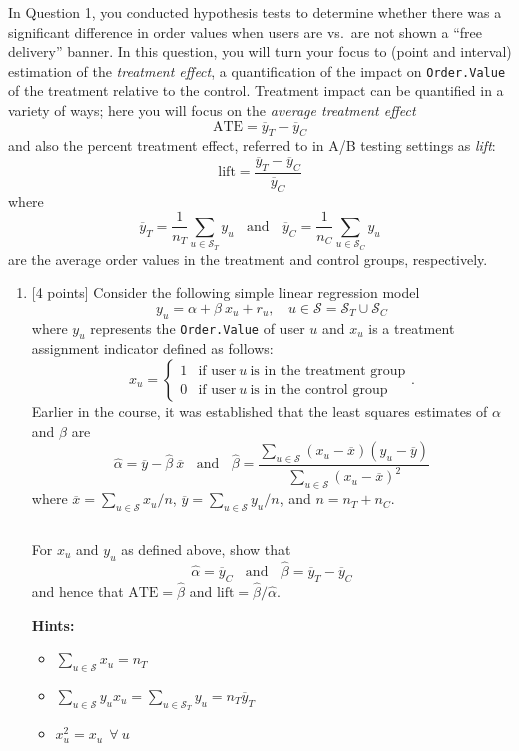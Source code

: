 \documentclass[
]{article}
\providecommand{\tightlist}{%
  \setlength{\itemsep}{0pt}\setlength{\parskip}{0pt}}
\begin{document}
In Question 1, you conducted hypothesis tests to determine whether there
was a significant difference in order values when users are vs.~are not
shown a ``free delivery'' banner. In this question, you will turn your
focus to (point and interval) estimation of the \emph{treatment effect},
a quantification of the impact on \texttt{Order.Value} of the treatment
relative to the control. Treatment impact can be quantified in a variety
of ways; here you will focus on the \emph{average treatment effect}
\[\text{ATE} = \overline{y}_T-\overline{y}_C\] and also the percent
treatment effect, referred to in A/B testing settings as \emph{lift}:
\[\text{lift} = \frac{\overline{y}_T-\overline{y}_C}{\overline{y}_C}\]
where
\[\overline{y}_T = \frac{1}{n_T}\sum_{u\in\mathcal{S}_T}y_u ~~~~ \text{and} ~~~~ \overline{y}_C = \frac{1}{n_C}\sum_{u\in\mathcal{S}_C}y_u\]
are the average order values in the treatment and control groups,
respectively.

\begin{enumerate}
\def\labelenumi{(\alph{enumi})}
\item
  {[}4 points{]} Consider the following simple linear regression model
  \[y_u = \alpha + \beta~x_u+r_u, ~~~~ u\in\mathcal{S}=\mathcal{S}_T\cup\mathcal{S}_C\]
  where \(y_u\) represents the \texttt{Order.Value} of user \(u\) and
  \(x_u\) is a treatment assignment indicator defined as follows:
  \[x_u =
    \begin{cases}
  1 & \text{if user}~u~\text{is in the treatment group} \\
  0 & \text{if user}~u~\text{is in the control group}
    \end{cases}.\] Earlier in the course, it was established that the
  least squares estimates of \(\alpha\) and \(\beta\) are
  \[\hat\alpha=\overline{y}-\hat\beta~\overline{x} ~~~~ \text{and} ~~~~ \hat\beta=\frac{\sum_{u\in\mathcal{S}}(x_u-\overline{x})(y_u-\overline{y})}{\sum_{u\in\mathcal{S}}(x_u-\overline{x})^2}\]
  where \(\overline{x} = \sum_{u\in\mathcal{S}}x_u/n\),
  \(\overline{y} = \sum_{u\in\mathcal{S}}y_u/n\), and \(n= n_T + n_C\).

  \(\;\)

  For \(x_u\) and \(y_u\) as defined above, show that
  \[\hat\alpha = \overline{y}_C~~~~ \text{and} ~~~~\hat\beta=\overline{y}_T-\overline{y}_C\]
  and hence that \(\text{ATE}=\hat\beta\) and
  \(\text{lift}=\hat\beta/\hat\alpha\).

  \textbf{Hints:}

  \begin{itemize}
  \tightlist
  \item
    \(\sum_{u\in\mathcal{S}}x_u = n_T\)
  \item
    \(\sum_{u\in\mathcal{S}}y_ux_u = \sum_{u\in\mathcal{S}_T}y_u = n_T\overline{y}_T\)
  \item
    \(x_u^2=x_u ~~\forall~ u\)
  \end{itemize}
\end{enumerate}
\end{document}
